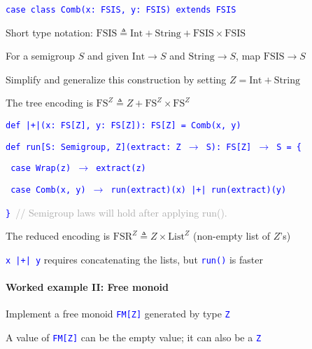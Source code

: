 \texttt{\textcolor{blue}{\footnotesize{}case class Comb(x: FSIS, y: FSIS)
extends FSIS}}{\footnotesize\par}

Short type notation: $\text{FSIS}\triangleq\text{Int}+\text{String}+\text{FSIS}\times\text{FSIS}$ 

For a semigroup $S$ and given $\text{Int}\rightarrow S$ and $\text{String}\rightarrow S$,
map $\text{FSIS}\rightarrow S$

Simplify and generalize this construction by setting $Z=\text{Int}+\text{String}$

The tree encoding is $\text{FS}^{Z}\triangleq Z+\text{FS}^{Z}\times\text{FS}^{Z}$

\texttt{\textcolor{blue}{\footnotesize{}def |+|(x: FS{[}Z{]}, y: FS{[}Z{]}): FS{[}Z{]}
= Comb(x, y)}}{\footnotesize\par}

\texttt{\textcolor{blue}{\footnotesize{}def run{[}S: Semigroup, Z{]}(extract: Z
$\rightarrow$ S): FS{[}Z{]} $\rightarrow$ S = \{}}{\footnotesize\par}

\texttt{\textcolor{blue}{\footnotesize{}  case Wrap(z) $\rightarrow$
extract(z)}}{\footnotesize\par}

\texttt{\textcolor{blue}{\footnotesize{}  case Comb(x, y) $\rightarrow$
run(extract)(x) |+| run(extract)(y)}}{\footnotesize\par}

\texttt{\textcolor{blue}{\footnotesize{}\} }}\textcolor{darkgray}{\footnotesize{}//
Semigroup laws will hold after applying run().}{\footnotesize\par}

The reduced encoding is $\text{FSR}^{Z}\triangleq Z\times\text{List}^{Z}$
(non-empty list of $Z$\textsf{'}s)

\texttt{\textcolor{blue}{\footnotesize{}x |+| y}} requires concatenating
the lists, but \texttt{\textcolor{blue}{\footnotesize{}run()}} is
faster


\paragraph{Worked example II: Free monoid}

Implement a free monoid \texttt{\textcolor{blue}{\footnotesize{}FM{[}Z{]}}}
generated by type \texttt{\textcolor{blue}{\footnotesize{}Z}} 

A value of \texttt{\textcolor{blue}{\footnotesize{}FM{[}Z{]}}} can
be the empty value; it can also be a \texttt{\textcolor{blue}{\footnotesize{}Z}} 

